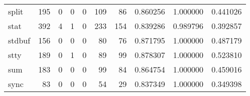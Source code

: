 \begin{tabular}{lrrrrrrrrr}
split     &                                   195 &                                                  0 &                                                  0 &                                                  0 &                                                109 &                                                 86 &                                           0.860256 &                               1.000000 &                             0.441026 \\
stat      &                                   392 &                                                  4 &                                                  1 &                                                  0 &                                                233 &                                                154 &                                           0.839286 &                               0.989796 &                             0.392857 \\
stdbuf    &                                   156 &                                                  0 &                                                  0 &                                                  0 &                                                 80 &                                                 76 &                                           0.871795 &                               1.000000 &                             0.487179 \\
stty      &                                   189 &                                                  0 &                                                  1 &                                                  0 &                                                 89 &                                                 99 &                                           0.878307 &                               1.000000 &                             0.523810 \\
sum       &                                   183 &                                                  0 &                                                  0 &                                                  0 &                                                 99 &                                                 84 &                                           0.864754 &                               1.000000 &                             0.459016 \\
sync      &                                    83 &                                                  0 &                                                  0 &                                                  0 &                                                 54 &                                                 29 &                                           0.837349 &                               1.000000 &                             0.349398 \\

\end{tabular}
